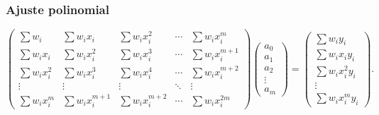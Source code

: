 \documentclass[a4paper]{report}
\begin{document}
\subsubsection{Ajuste polinomial}

\begin{equation}
\left(\begin{array}{ccccc}
\sum w_i & \sum w_ix_i &  \sum w_ix_i^2 & \cdots & \sum w_ix_i^m \\
\sum w_ix_i &  \sum w_ix_i^2 &  \sum w_ix_i^3 & \cdots & \sum w_ix_i^{m+1} \\
\sum w_ix^2_i &  \sum w_ix_i^3 &  \sum w_ix_i^4 & \cdots & \sum w_ix_i^{m+2} \\
\vdots & \vdots & \vdots & \ddots & \vdots \\
\sum w_ix_i^m &  \sum w_ix_i^{m+1}&  \sum w_ix_i^{m+2} & \cdots & \sum w_ix_i^{2m}
\end{array}
\right)\left(\begin{array}{c}a_0\\a_1\\a_2\\ \vdots\\a_m\end{array}\right)
=\left(\begin{array}{c}
\sum w_iy_i\\ \sum w_ix_iy_i\\ \sum w_ix_i^2y_i\\ \vdots\\ \sum w_ix_i^m y_i\end{array}\right).
\end{equation}
\end{document}

